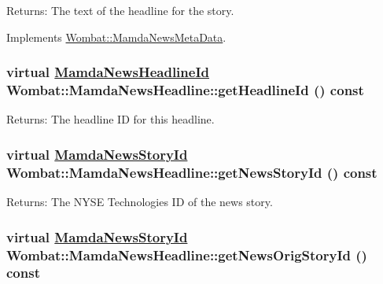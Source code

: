 \begin{Desc}
\item[Returns:]The text of the headline for the story. \end{Desc}


Implements \hyperlink{classWombat_1_1MamdaNewsMetaData_c80a30c0b95497091c32972658ab4340}{Wombat::Mamda\-News\-Meta\-Data}.\hypertarget{classWombat_1_1MamdaNewsHeadline_5958cb72f09cce3b761999ee28e27810}{
\subsubsection[getHeadlineId]{\setlength{\rightskip}{0pt plus 5cm}virtual \hyperlink{namespaceWombat_cb354a5fc91d5b728f8f1255aae3e196}{Mamda\-News\-Headline\-Id} Wombat::Mamda\-News\-Headline::get\-Headline\-Id () const}}
\label{classWombat_1_1MamdaNewsHeadline_5958cb72f09cce3b761999ee28e27810}


\begin{Desc}
\item[Returns:]The headline ID for this headline. \end{Desc}
\hypertarget{classWombat_1_1MamdaNewsHeadline_b30a668741dbbb00450c6a573fdf084f}{
\subsubsection[getNewsStoryId]{\setlength{\rightskip}{0pt plus 5cm}virtual \hyperlink{namespaceWombat_f7b94f4bb44eb78420c0d3ba0413424e}{Mamda\-News\-Story\-Id} Wombat::Mamda\-News\-Headline::get\-News\-Story\-Id () const}}
\label{classWombat_1_1MamdaNewsHeadline_b30a668741dbbb00450c6a573fdf084f}


\begin{Desc}
\item[Returns:]The NYSE Technologies ID of the news story. \end{Desc}
\hypertarget{classWombat_1_1MamdaNewsHeadline_06be0c043515b210d54e7a345577a13e}{
\subsubsection[getNewsOrigStoryId]{\setlength{\rightskip}{0pt plus 5cm}virtual \hyperlink{namespaceWombat_f7b94f4bb44eb78420c0d3ba0413424e}{Mamda\-News\-Story\-Id} Wombat::Mamda\-News\-Headline::get\-News\-Orig\-Story\-Id () const}}
\label{classWombat_1_1MamdaNewsHeadline_06be0c043515b210d54e7a345577a13e}


